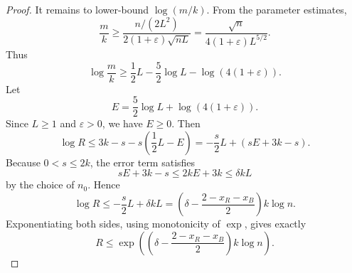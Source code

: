 \begin{proof}
It remains to lower-bound \(\log(m/k)\).  From the parameter estimates,
\[
\frac{m}{k}
\ge
\frac{n/(2L^2)}{2(1+\varepsilon)\sqrt{nL}}
=
\frac{\sqrt n}{4(1+\varepsilon)L^{5/2}}.
\]
Thus
\[
\log\frac{m}{k}
\ge
\frac12 L-\frac52\log L-\log(4(1+\varepsilon)).
\]
Let
\[
E=\frac52\log L+\log(4(1+\varepsilon)).
\]
Since \(L\ge1\) and \(\varepsilon>0\), we have \(E\ge0\).
Then
\[
\log R
\le
3k-s-s\left(\frac12 L-E\right)
=-\frac{s}{2}L+(sE+3k-s).
\]
Because \(0<s\le2k\), the error term satisfies
\[
sE+3k-s\le 2kE+3k\le \delta kL
\]
by the choice of \(n_0\).  Hence
\[
\log R\le -\frac{s}{2}L+\delta kL
=\left(\delta-\frac{2-x_R-x_B}{2}\right)k\log n.
\]
Exponentiating both sides, using monotonicity of \(\exp\), gives exactly
\[
R\le
\exp\left(\left(\delta-\frac{2-x_R-x_B}{2}\right)k\log n\right).
\]
\end{proof}
